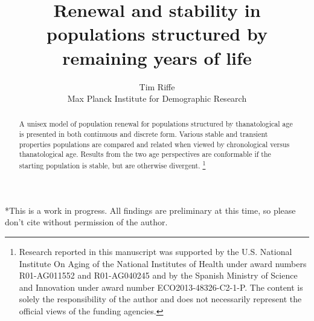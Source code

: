 \documentclass{article}
\newcommand\ackn[1]{%
  \begingroup
  \renewcommand\thefootnote{}\footnote{#1}%
  \addtocounter{footnote}{-1}%
  \endgroup
}
\begin{document}
\title{Renewal and stability in populations structured by remaining
years of life}
\author{Tim Riffe \\ Max Planck Institute for Demographic Research}
\maketitle

\begin{abstract}
A unisex model of population renewal for populations structured by
thanatological age is presented in both continuous and discrete form. Various
stable and transient properties populations are compared and related when viewed
by chronological versus thanatological age. Results from the two age perspectives are conformable if the starting
population is stable, but are otherwise divergent.\ackn{Research reported in this manuscript
was supported by the U.S.
National Institute On Aging of the National Institutes of Health under award numbers R01-AG011552 and R01-AG040245 and by the Spanish Ministry of Science and Innovation under award
number ECO2013-48326-C2-1-P. The content is solely the responsibility of the
author and does not necessarily represent the official views of the funding
agencies.}
\end{abstract}

*This is a work in progress. All findings are preliminary at this time, so
please don't cite without permission of the author.
\vspace{2em}

\onehalfspacing
\end{document}
